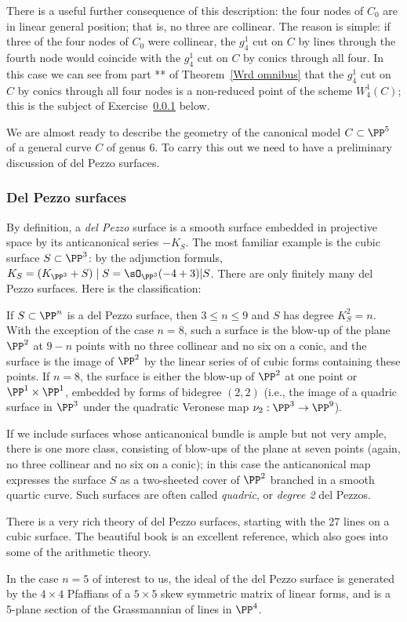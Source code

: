There is a useful further consequence of this description: the four nodes of $C_0$ are in linear general position; that is, no three are collinear. The reason is simple: if three of the four nodes of $C_0$ were collinear, the $g^1_4$ cut on $C$ by lines through the fourth node would coincide with the $g^1_4$ cut on $C$ by conics through all four. In this case we can see from part **  of Theorem~\ref{Wrd omnibus} that the $g^1_4$ cut on $C$ by conics through all four nodes is a non-reduced point of the scheme $W^1_4(C)$; this is the subject of Exercise~\ref{} below. 

We are almost ready to describe the geometry of the canonical model $C \subset \PP^5$ of a general curve $C$ of genus 6. To carry this out we need to have a preliminary discussion of del Pezzo surfaces.

\subsubsection{Del Pezzo surfaces}

By definition,
a \emph{del Pezzo} surface is a smooth surface embedded in projective space by its anticanonical series $-K_S$. The most familiar example is the cubic surface $S \subset \PP^3$: by the adjunction formuls, $K_S = (K_{\PP^3}+S)\mid S
= \sO_{\PP^3}(-4+3)|S$. There are only finitely many del Pezzo surfaces. Here is the classification:

\begin{fact}
If $S\subset \PP^n$ is a del Pezzo surface, then
$3\leq n\leq 9$ and $S$ has degree $K_S^2 = n$. With the exception of the case $n=8$, such a surface is the blow-up of the plane $\PP^2$ at $9-n$ points with no three collinear and no six on a conic, 
and the surface is the image of $\PP^2$ by  the linear series of of cubic forms containing these points. If $n=8$, the surface
is either the blow-up of $\PP^2$  at one point or $\PP^1 \times \PP^1$, embedded by forms of bidegree $(2,2)$ (i.e., the image of a quadric surface in $\PP^3$ under the quadratic Veronese map $\nu_2 : \PP^3 \to \PP^9$). 

If we include surfaces whose anticanonical bundle is ample but not very ample, there is one more class, consisting of blow-ups of the plane at seven points (again, no three collinear and no six on a conic); in this case the anticanonical map expresses the surface $S$ as a two-sheeted cover of $\PP^2$ branched in a smooth quartic curve. Such surfaces are often called \emph{quadric}, or \emph{degree 2} del Pezzos.

There is a very rich theory of del Pezzo surfaces, starting with the 27 lines on a cubic surface. The
beautiful book \cite{Manin} is an excellent reference, which also goes into some of the arithmetic theory.

In the case $n=5$ of interest to us, the ideal of the del Pezzo surface 
is generated by the $4\times 4$ Pfaffians of a $5\times 5$ skew symmetric matrix of linear forms, and is a 5-plane section of the Grassmannian of lines in $\PP^4$.
\end{fact}


